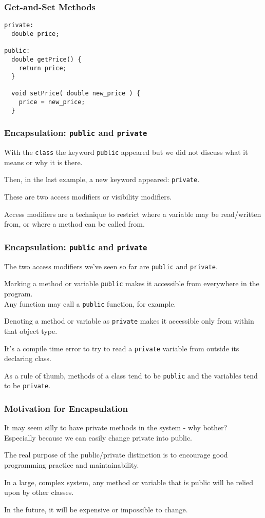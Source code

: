 \begin{frame}[fragile]
\frametitle{Get-and-Set Methods}

\begin{verbatim}
private:
  double price;

public:
  double getPrice() {
    return price;
  }

  void setPrice( double new_price ) {
    price = new_price;
  }
\end{verbatim}

\end{frame}




\begin{frame}
\frametitle{Encapsulation: \texttt{public} and \texttt{private}}

With the \texttt{class} the keyword \texttt{public} appeared but we did not discuss what it means or why it is there.

Then, in the last example, a new keyword appeared: \texttt{private}.

These are two \alert{access modifiers} or \alert{visibility modifiers}.

Access modifiers are a technique to restrict where a variable may be read/written from, or where a method can be called from.

\end{frame}

\begin{frame}
\frametitle{Encapsulation: \texttt{public} and \texttt{private}}

The two access modifiers we've seen so far are \texttt{public} and \texttt{private}.

Marking a method or variable \texttt{public} makes it accessible from everywhere in the program. \\
\quad Any function may call a \texttt{public} function, for example.

Denoting a method or variable as \texttt{private} makes it accessible only from within that object type.

It's a compile time error to try to read a \texttt{private} variable from outside its declaring class.

As a rule of thumb, methods of a class tend to be \texttt{public} and the variables tend to be \texttt{private}.

\end{frame}

\begin{frame}
\frametitle{Motivation for Encapsulation}
It may seem silly to have private methods in the system - why bother?\\
\quad Especially because we can easily change private into public.

The real purpose of the public/private distinction is to encourage good programming practice and maintainability.

In a large, complex system, any method or variable that is public will be relied upon by other classes.

In the future, it will be expensive or impossible to change.

\end{frame}

